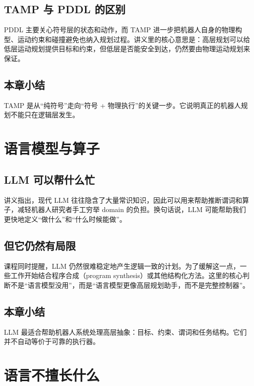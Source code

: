 \documentclass[a4paper]{article}
\begin{document}
\subsection{TAMP 与 PDDL 的区别}

PDDL 主要关心符号层的状态和动作，而 TAMP 进一步把机器人自身的物理构型、运动约束和碰撞避免也纳入规划过程。讲义里的核心意思是：高层规划可以给低层运动规划提供目标和约束，但低层是否能安全到达，仍然要由物理运动规划来保证。

\subsection{本章小结}

TAMP 是从“纯符号”走向“符号 + 物理执行”的关键一步。它说明真正的机器人规划不能只在逻辑层发生。

\section{语言模型与算子}

\subsection{LLM 可以帮什么忙}

讲义指出，现代 LLM 往往隐含了大量常识知识，因此可以用来帮助推断谓词和算子，减轻机器人研究者手工穷举 domain 的负担。换句话说，LLM 可能帮助我们更快地定义“做什么”和“什么时候能做”。

\subsection{但它仍然有局限}

课程同时提醒，LLM 仍然很难稳定地产生逻辑一致的计划。为了缓解这一点，一些工作开始结合程序合成（program synthesis）或其他结构化方法。这里的核心判断不是“语言模型没用”，而是“语言模型更像高层规划助手，而不是完整控制器”。

\subsection{本章小结}

LLM 最适合帮助机器人系统处理高层抽象：目标、约束、谓词和任务结构。它们并不自动等价于可靠的执行器。

\section{语言不擅长什么}
\end{document}
